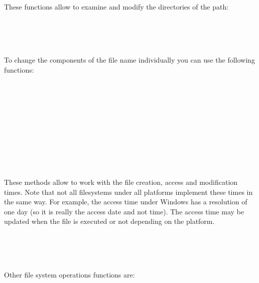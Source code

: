 
These functions allow to examine and modify the directories of the path:

\\
\\
\\

To change the components of the file name individually you can use the
following functions:

\\
\\
\\
\\
\\
\\
\\
\\
\\


These methods allow to work with the file creation, access and modification
times. Note that not all filesystems under all platforms implement these times
in the same way. For example, the access time under Windows has a resolution of
one day (so it is really the access date and not time). The access time may be
updated when the file is executed or not depending on the platform.

\\
\\
\\

Other file system operations functions are:

\\


